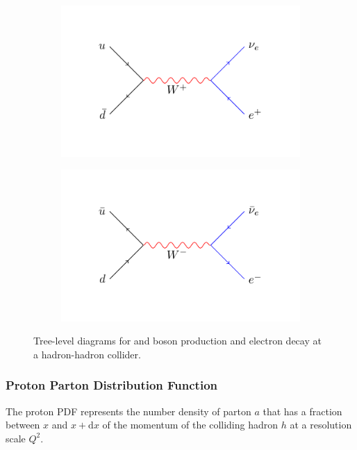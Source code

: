 \begin{figure}[htbp]
  \centering
  \begin{subfigure}{0.45\textwidth}
    \centering
    \includegraphics[width=\textwidth]{w_process_wp}
    \caption{\HepProcess{\Pup + \APdown \to \PWp \to \Pleptonplus \Pnulepton}}
    \label{fig:w_process_wp}
  \end{subfigure}
  \begin{subfigure}{0.45\textwidth}
    \centering
    \includegraphics[width=\textwidth]{w_process_wm}
    \caption{\HepProcess{\APup + \Pdown \to \PWm \to \Pleptonminus \APnulepton}}
    \label{fig:w_process_wm}
  \end{subfigure}
  \caption{Tree-level diagrams for \PWp and \PWm boson production and electron
decay at a hadron-hadron collider.}\label{fig:w_process} 
\end{figure}

\subsubsection*{Proton Parton Distribution Function} 
The proton PDF represents the number density of
parton $a$ that has a fraction between $x$ and $x+\mathrm{d}x$ of the
momentum of the colliding hadron $h$ at a resolution scale $Q^{2}$.

